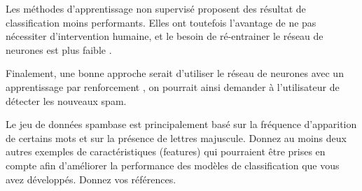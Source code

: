 \begin{homeworkProblem}
\begin{homeworkSection}{4.2}
{			Les méthodes d'apprentissage non supervisé proposent des résultat de classification moins performants.
			Elles ont toutefois l'avantage de ne pas nécessiter d'intervention humaine, et le besoin de ré-entrainer le réseau de neurones est plus faible \cite{spring:classComp}.
			
			
			Finalement, une bonne approche serait d'utiliser le réseau de neurones avec un apprentissage par renforcement \cite{wiki-renforcement}, on pourrait ainsi demander à l'utilisateur de détecter les nouveaux spam.
			}
			
		\end{homeworkSection}
			
		\begin{homeworkSection}{4.3}

			Le jeu de données spambase est principalement basé sur la fréquence d’apparition de
			certains mots et sur la présence de lettres majuscule. Donnez au moins deux autres
			exemples de caractéristiques (features) qui pourraient être prises en compte afin
			d’améliorer la performance des modèles de classification que vous avez développés.
			Donnez vos références. \\

					
		\end{homeworkSection}
		
			
	\end{homeworkProblem}